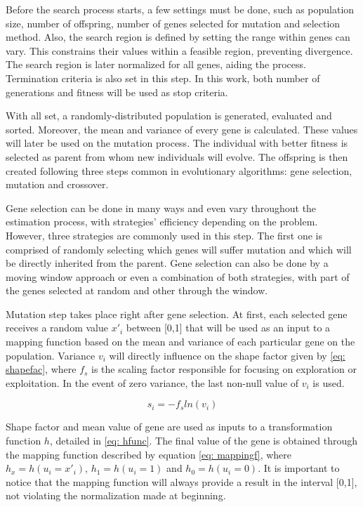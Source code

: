 Before the search process starts, a few settings must be done, such as population size, number of offspring, number of genes selected for mutation and selection method. Also, the search region is defined by setting the range within genes can vary. This constrains their values within a feasible region, preventing divergence. The search region is later normalized for all genes, aiding the process. Termination criteria is also set in this step. In this work, both number of generations and fitness will be used as stop criteria.

With all set, a randomly-distributed population is generated, evaluated and sorted. Moreover, the mean and variance of every gene is calculated. These values will later be used on the mutation process. The individual with better fitness is selected as parent from whom new individuals will evolve. The offspring is then created following three steps common in evolutionary algorithms: gene selection, mutation and crossover.

Gene selection can be done in many ways and even vary throughout the estimation process, with strategies' efficiency depending on the problem. However, three strategies are commonly used in this step. The first one is comprised of randomly selecting which genes will suffer mutation and which will be directly inherited from the parent. Gene selection can also be done by a moving window approach or even a combination of both strategies, with part of the genes selected at random and other through the window.

Mutation step takes place right after gene selection. At first, each selected gene receives a random value $x'_{i}$ between [0,1] that will be used as an input to a mapping function based on the mean and variance of each particular gene on the population. Variance $v_{i}$ will directly influence on the shape factor given by \eqref{eq: shapefac}, where $f_{s}$ is the scaling factor responsible for focusing on exploration or exploitation. In the event of zero variance, the last non-null value of $v_{i}$ is used.

\begin{equation}
	s_{i} = -f_{s}ln(v_{i})
	\label{eq: shapefac}
\end{equation}

Shape factor and mean value of gene are used as inputs to a transformation function $h$, detailed in \eqref{eq: hfunc}. The final value of the gene is obtained through the mapping function described by equation \eqref{eq: mappingf}, where $h_{x} = h(u_{i} = x'_{i})$, $h_{1} = h(u_{i} = 1)$ and $h_{0} = h(u_{i} = 0)$. It is important to notice that the mapping function will always provide a result in the interval [0,1], not violating the normalization made at beginning.

